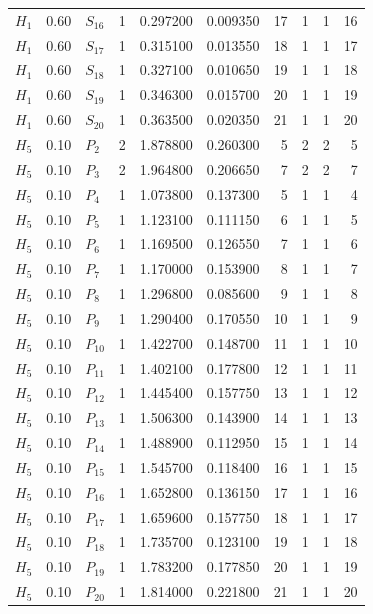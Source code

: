 \begin{longtable}{lrlrrrrrrr}
$H_1$ & 0.60 & $S_{16}$ & 1 & 0.297200 & 0.009350 & 17 & 1 & 1 & 16\\
$H_1$ & 0.60 & $S_{17}$ & 1 & 0.315100 & 0.013550 & 18 & 1 & 1 & 17\\
$H_1$ & 0.60 & $S_{18}$ & 1 & 0.327100 & 0.010650 & 19 & 1 & 1 & 18\\
$H_1$ & 0.60 & $S_{19}$ & 1 & 0.346300 & 0.015700 & 20 & 1 & 1 & 19\\
$H_1$ & 0.60 & $S_{20}$ & 1 & 0.363500 & 0.020350 & 21 & 1 & 1 & 20\\
$H_5$ & 0.10 & $P_{2}$ & 2 & 1.878800 & 0.260300 & 5 & 2 & 2 & 5\\
$H_5$ & 0.10 & $P_{3}$ & 2 & 1.964800 & 0.206650 & 7 & 2 & 2 & 7\\
$H_5$ & 0.10 & $P_{4}$ & 1 & 1.073800 & 0.137300 & 5 & 1 & 1 & 4\\
$H_5$ & 0.10 & $P_{5}$ & 1 & 1.123100 & 0.111150 & 6 & 1 & 1 & 5\\
$H_5$ & 0.10 & $P_{6}$ & 1 & 1.169500 & 0.126550 & 7 & 1 & 1 & 6\\
$H_5$ & 0.10 & $P_{7}$ & 1 & 1.170000 & 0.153900 & 8 & 1 & 1 & 7\\
$H_5$ & 0.10 & $P_{8}$ & 1 & 1.296800 & 0.085600 & 9 & 1 & 1 & 8\\
$H_5$ & 0.10 & $P_{9}$ & 1 & 1.290400 & 0.170550 & 10 & 1 & 1 & 9\\
$H_5$ & 0.10 & $P_{10}$ & 1 & 1.422700 & 0.148700 & 11 & 1 & 1 & 10\\
$H_5$ & 0.10 & $P_{11}$ & 1 & 1.402100 & 0.177800 & 12 & 1 & 1 & 11\\
$H_5$ & 0.10 & $P_{12}$ & 1 & 1.445400 & 0.157750 & 13 & 1 & 1 & 12\\
$H_5$ & 0.10 & $P_{13}$ & 1 & 1.506300 & 0.143900 & 14 & 1 & 1 & 13\\
$H_5$ & 0.10 & $P_{14}$ & 1 & 1.488900 & 0.112950 & 15 & 1 & 1 & 14\\
$H_5$ & 0.10 & $P_{15}$ & 1 & 1.545700 & 0.118400 & 16 & 1 & 1 & 15\\
$H_5$ & 0.10 & $P_{16}$ & 1 & 1.652800 & 0.136150 & 17 & 1 & 1 & 16\\
$H_5$ & 0.10 & $P_{17}$ & 1 & 1.659600 & 0.157750 & 18 & 1 & 1 & 17\\
$H_5$ & 0.10 & $P_{18}$ & 1 & 1.735700 & 0.123100 & 19 & 1 & 1 & 18\\
$H_5$ & 0.10 & $P_{19}$ & 1 & 1.783200 & 0.177850 & 20 & 1 & 1 & 19\\
$H_5$ & 0.10 & $P_{20}$ & 1 & 1.814000 & 0.221800 & 21 & 1 & 1 & 20\\

\end{longtable}
